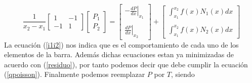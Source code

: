 \documentclass[10pt,a4paper]{article}
\begin{document}
\begin{equation}\label{i1i2}
 \frac{1}{x_2-x_1}\left [\begin{array}{cc}
                               1 & -1 \\
                               -1 & 1 
                         \end{array}
                  \right]
                  \left [\begin{array}{c}
                               P_1 \\
                               P_2 
                         \end{array}
                  \right] = \left [\begin{array}{c}
                                        -\left .\frac{dP}{dx}\right |_{x_1} \\
                                                            \\
                                         \left .\frac{dP}{dx}\right |_{x_2}
                                   \end{array}
                            \right] +
                            \left [\begin{array}{c}
                                         \int_{x_1}^{x_2}f(x)N_1(x)dx \\
                                                                      \\
                                         \int_{x_1}^{x_2}f(x)N_2(x)dx
                                   \end{array} \right] 
\end{equation}
La ecuaci\'on (\ref{i1i2}) nos indica que es el comportamiento de cada uno de los elementos de la barra. Adem\'as dichas ecuaciones estan ya minimizadas de acuerdo con (\ref{residuo}), por tanto podemos decir que debe cumplir la ecuaci\'on (\ref{qpoisson}). Finalmente podemos reemplazar $P$ por $T$, siendo
\end{document}
